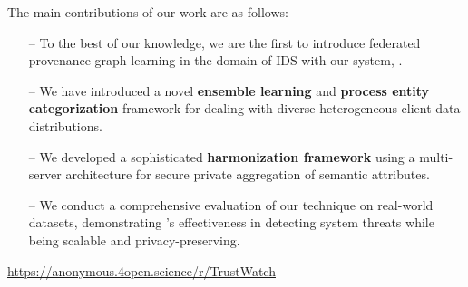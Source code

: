 The main contributions of our work are as follows:

\begin{itemize}[topsep=.1ex,itemsep=-.1ex,leftmargin=*]
    \item[--] To the best of our knowledge, we are the first to introduce federated provenance graph learning in the domain of IDS with our system, \Sys.
    \item[--] We have introduced a novel \textbf{ensemble learning} and \textbf{process entity categorization} framework for dealing with diverse heterogeneous client data distributions.
    \item[--] We developed a sophisticated \textbf{\wordvec harmonization framework} using a multi-server architecture for secure private aggregation of semantic attributes.
    \item[--] We conduct a comprehensive evaluation of our technique on real-world datasets, demonstrating \Sys's effectiveness in detecting system threats while being scalable and privacy-preserving.
\end{itemize}

 \url{https://anonymous.4open.science/r/TrustWatch}